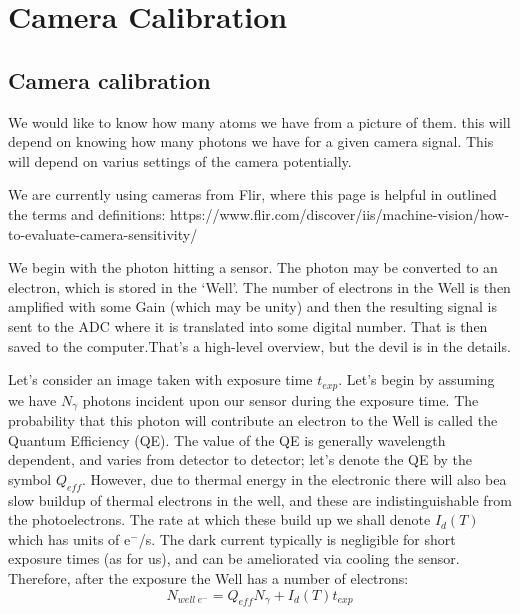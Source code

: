 \documentclass[../../main.tex]{subfiles} %
\begin{document}
\chapter{Camera Calibration} 
\section{Camera calibration}
We would like to know how many atoms we have from a picture of them. this will depend on knowing how many photons we have for a given camera signal. This will depend on varius settings of the camera potentially. 

We are currently using cameras from Flir, where this page is helpful in outlined the terms and definitions: https://www.flir.com/discover/iis/machine-vision/how-to-evaluate-camera-sensitivity/

We begin with the photon hitting a sensor. The photon may be converted to an electron, which is stored in the `Well'. The number of electrons in the Well is then amplified with some Gain (which may be unity) and then the resulting signal is sent to the ADC where it is translated into some digital number. That is then saved to the computer.That's a high-level overview, but the devil is in the details. 

Let's consider an image taken with exposure time $t_{exp}$. Let's begin by assuming we have $N_\gamma$ photons incident upon our sensor during the exposure time. The probability that this photon will contribute an electron to the Well is called the Quantum Efficiency (QE). The value of the QE is generally wavelength dependent, and varies from detector to detector; let's denote the QE by the symbol $Q_{eff}$. However, due to thermal energy in the electronic there will also bea slow buildup of thermal electrons in the well, and these are indistinguishable from the photoelectrons. The rate at which these build up we shall denote $I_d(T)$ which has units of e$^-$/s. The dark current typically is negligible for short exposure times (as for us), and can be ameliorated via cooling the sensor. Therefore, after the exposure the Well has a number of electrons:
\begin{equation}
    N_{well\ e^-}=Q_{eff}N_{\gamma}+I_d(T)t_{exp}
\end{equation}
\end{document}
